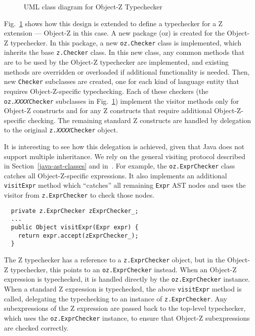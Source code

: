 \documentclass{llncs}
\begin{document}
\def\epsfsize#1#2{0.50#1}
\begin{figure}[t]
\begin{center}
\caption{UML class diagram for Object-Z Typechecker}\label{fig:oztypechecker}
\end{center}
\end{figure}
\def\epsfsize#1#2{\epsfxsize}

Fig.~\ref{fig:oztypechecker} shows how this design is extended to
define a typechecker for a Z extension --- Object-Z in this case.  A
new package (oz) is created for the Object-Z typechecker.  In this
package, a new {\tt oz.Checker} class is implemented, which inherits
the base {\tt z.Checker} class.  In this new class, any common methods
that are to be used by the Object-Z typechecker are implemented, and
existing methods are overridden or overloaded if additional
functionality is needed.  Then, new \texttt{Checker} subclasses are created,
one for each kind of language entity that requires Object-Z-specific
typechecking.  Each of these checkers (the
\texttt{oz.\emph{XXXX}Checker} subclasses in
Fig.~\ref{fig:oztypechecker}) implement the visitor methods only for
Object-Z constructs and for any Z constructs that require additional
Object-Z-specific checking.  The remaining standard Z constructs are
handled by delegation to the original
\texttt{z.\emph{XXXX}Checker} object.

It is interesting to see how this delegation is achieved, given that
Java does not support multiple inheritance.  We rely on the general
visiting protocol described in Section~\ref{java-ast-classes} and
in~\cite{czt}.  For example, the \texttt{oz.ExprChecker} class catches
all Object-Z-specific expressions.  It also implements an additional
\texttt{visitExpr} method which ``catches'' all remaining
\texttt{Expr} AST nodes and uses the visitor from
\texttt{z.ExprChecker} to check those nodes.
\begin{verbatim}
  private z.ExprChecker zExprChecker_;
  ...
  public Object visitExpr(Expr expr) {
    return expr.accept(zExprChecker_);
  }
\end{verbatim}

The Z typechecker has a reference to a \texttt{z.ExprChecker} object,
but in the Object-Z typechecker, this points to an \texttt{oz.ExprChecker}
instead.  When an Object-Z expression is typechecked, it is handled
directly by the \texttt{oz.ExprChecker} instance.  When a standard Z
expression is typechecked, the above \texttt{visitExpr} method
is called, delegating the typechecking to an instance of
\texttt{z.ExprChecker}.  Any subexpressions of the Z expression are
passed back to the top-level type\-chec\-ker, which uses the
\texttt{oz.Expr\-Chec\-ker} instance, to ensure that Ob\-ject-Z subexpressions
are checked correctly.
\end{document}
